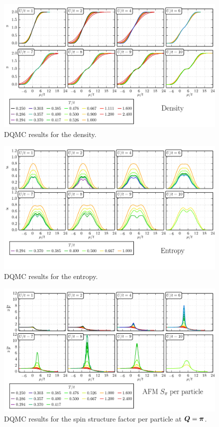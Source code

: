 \begin{figure}
    \centering
\includegraphics[width=1.0\textwidth]{../figures/hubbard-data/dataplots/QMC_Final/density_10.png}
\caption{ DQMC results for the density. } 
\label{fig:QMCdens}
\end{figure}
\begin{figure}
    \centering
\includegraphics[width=1.0\textwidth]{../figures/hubbard-data/dataplots/QMC_Final/entropy_10.png}
\caption{ DQMC results for the entropy. } 
\label{fig:QMCent}
\end{figure}
\begin{figure}
    \centering
\includegraphics[width=1.0\textwidth]{../figures/hubbard-data/dataplots/QMC_Final/spi_n_10.png}
\caption{ DQMC results for the spin structure factor per particle at
$\bm{Q}=\bm{\pi}$. } 
\label{fig:QMCspi}
\end{figure}
